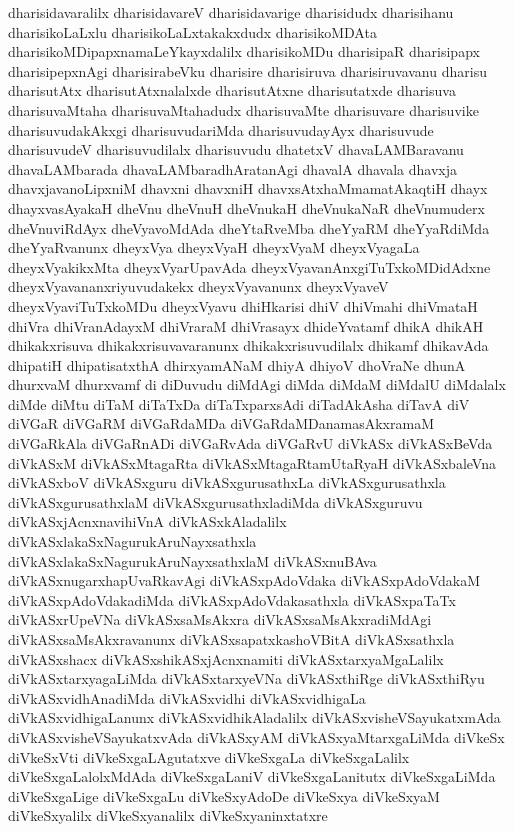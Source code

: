 {dharisidavaralilx
dharisidavareV
dharisidavarige
dharisidudx
dharisihanu
dharisikoLaLxlu
dharisikoLaLxtakakxdudx
dharisikoMDAta
dharisikoMDipapxnamaLeYkayxdalilx
dharisikoMDu
dharisipaR
dharisipapx
dharisipepxnAgi
dharisirabeVku
dharisire
dharisiruva
dharisiruvavanu
dharisu
dharisutAtx
dharisutAtxnalalxde
dharisutAtxne
dharisutatxde
dharisuva
dharisuvaMtaha
dharisuvaMtahadudx
dharisuvaMte
dharisuvare
dharisuvike
dharisuvudakAkxgi
dharisuvudariMda
dharisuvudayAyx
dharisuvude
dharisuvudeV
dharisuvudilalx
dharisuvudu
dhatetxV
dhavaLAMBaravanu
dhavaLAMbarada
dhavaLAMbaradhAratanAgi
dhavalA
dhavala
dhavxja
dhavxjavanoLipxniM
dhavxni
dhavxniH
dhavxsAtxhaMmamatAkaqtiH
dhayx
dhayxvasAyakaH
dheVnu
dheVnuH
dheVnukaH
dheVnukaNaR
dheVnumuderx
dheVnuviRdAyx
dheVyavoMdAda
dheYtaRveMba
dheYyaRM
dheYyaRdiMda
dheYyaRvanunx
dheyxVya
dheyxVyaH
dheyxVyaM
dheyxVyagaLa
dheyxVyakikxMta
dheyxVyarUpavAda
dheyxVyavanAnxgiTuTxkoMDidAdxne
dheyxVyavananxriyuvudakekx
dheyxVyavanunx
dheyxVyaveV
dheyxVyaviTuTxkoMDu
dheyxVyavu
dhiHkarisi
dhiV
dhiVmahi
dhiVmataH
dhiVra
dhiVranAdayxM
dhiVraraM
dhiVrasayx
dhideYvatamf
dhikA
dhikAH
dhikakxrisuva
dhikakxrisuvavaranunx
dhikakxrisuvudilalx
dhikamf
dhikavAda
dhipatiH
dhipatisatxthA
dhirxyamANaM
dhiyA
dhiyoV
dhoVraNe
dhunA
dhurxvaM
dhurxvamf
di
diDuvudu
diMdAgi
diMda
diMdaM
diMdalU
diMdalalx
diMde
diMtu
diTaM
diTaTxDa
diTaTxparxsAdi
diTadAkAsha
diTavA
diV
diVGaR
diVGaRM
diVGaRdaMDa
diVGaRdaMDanamasAkxramaM
diVGaRkAla
diVGaRnADi
diVGaRvAda
diVGaRvU
diVkASx
diVkASxBeVda
diVkASxM
diVkASxMtagaRta
diVkASxMtagaRtamUtaRyaH
diVkASxbaleVna
diVkASxboV
diVkASxguru
diVkASxgurusathxLa
diVkASxgurusathxla
diVkASxgurusathxlaM
diVkASxgurusathxladiMda
diVkASxguruvu
diVkASxjAcnxnavihiVnA
diVkASxkAladalilx
diVkASxlakaSxNagurukAruNayxsathxla
diVkASxlakaSxNagurukAruNayxsathxlaM
diVkASxnuBAva
diVkASxnugarxhapUvaRkavAgi
diVkASxpAdoVdaka
diVkASxpAdoVdakaM
diVkASxpAdoVdakadiMda
diVkASxpAdoVdakasathxla
diVkASxpaTaTx
diVkASxrUpeVNa
diVkASxsaMsAkxra
diVkASxsaMsAkxradiMdAgi
diVkASxsaMsAkxravanunx
diVkASxsapatxkashoVBitA
diVkASxsathxla
diVkASxshacx
diVkASxshikASxjAcnxnamiti
diVkASxtarxyaMgaLalilx
diVkASxtarxyagaLiMda
diVkASxtarxyeVNa
diVkASxthiRge
diVkASxthiRyu
diVkASxvidhAnadiMda
diVkASxvidhi
diVkASxvidhigaLa
diVkASxvidhigaLanunx
diVkASxvidhikAladalilx
diVkASxvisheVSayukatxmAda
diVkASxvisheVSayukatxvAda
diVkASxyAM
diVkASxyaMtarxgaLiMda
diVkeSx
diVkeSxVti
diVkeSxgaLAgutatxve
diVkeSxgaLa
diVkeSxgaLalilx
diVkeSxgaLalolxMdAda
diVkeSxgaLaniV
diVkeSxgaLanitutx
diVkeSxgaLiMda
diVkeSxgaLige
diVkeSxgaLu
diVkeSxyAdoDe
diVkeSxya
diVkeSxyaM
diVkeSxyalilx
diVkeSxyanalilx
diVkeSxyaninxtatxre
}
